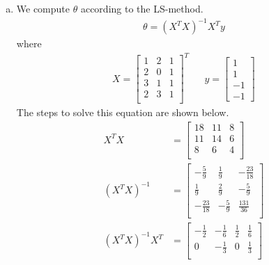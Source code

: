 \documentclass[a4paper, 10pt, twoside]{article}
\begin{document}
\begin{enumerate}[a)]
    \item We compute $\theta$ according to the LS-method.
          \begin{align}
              \theta = (X^TX)^{-1}X^Ty
          \end{align}
          where
          \begin{align*}
              X =
              \begin{bmatrix}
                  1 & 2 & 1 \\
                  2 & 0 & 1 \\
                  3 & 1 & 1 \\
                  2 & 3 & 1 \\
              \end{bmatrix}^T
               &  &
              y =
              \begin{bmatrix}
                  1 \\ 1 \\ -1 \\ -1
              \end{bmatrix}
          \end{align*}
          The steps to solve this equation are shown below.
          \begin{align*}
              X^TX           & =
              \begin{bmatrix}
                  18 & 11 & 8 \\
                  11 & 14 & 6 \\
                  8  & 6  & 4 \\
              \end{bmatrix} \\
              (X^TX)^{-1}    & =
              \begin{bmatrix}
                  -\frac{5}{9}   & \frac{1}{9}  & -\frac{23}{18} \\
                  \frac{1}{9}    & \frac{2}{9}  & -\frac{5}{9}   \\
                  -\frac{23}{18} & -\frac{5}{9} & \frac{131}{36} \\
              \end{bmatrix} \\
              (X^TX)^{-1}X^T & =
              \begin{bmatrix}
                  -\frac{1}{2} & -\frac{1}{6}   & \frac{1}{2}  & \frac{1}{6}   \\
                  0            & -\frac{1}{3}   & 0            & \frac{1}{3}   \\

\end{bmatrix}
\end{align*}
\end{enumerate}
\end{document}
